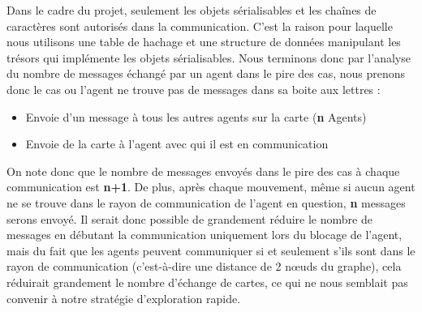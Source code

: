 \documentclass[10pt]{article}
\newcommand\tab[1][0.65cm]{\hspace*{#1}}
\begin{document}
\tab Dans le cadre du projet, seulement les objets sérialisables et les chaînes de caractères sont autorisés dans la communication. C'est la raison pour laquelle nous utilisons une table de hachage et une structure de données manipulant les trésors qui implémente les objets sérialisables. Nous terminons donc par l'analyse du nombre de messages échangé par un agent dans le pire des cas, nous prenons donc le cas ou l'agent ne trouve pas de messages dans sa boite aux lettres : 
\begin{itemize}
  \item Envoie d'un message à tous les autres agents sur la carte (\textbf{n} Agents)
  \item Envoie de la carte à l'agent avec qui il est en communication
\end{itemize}
On note donc que le nombre de messages envoyés dans le pire des cas à chaque communication est \textbf{n+1}. De plus, après chaque mouvement, même si aucun agent ne se trouve dans le rayon de communication de l'agent en question, \textbf{n} messages serons envoyé. Il serait donc possible de grandement réduire le nombre de messages en débutant la communication uniquement lors du blocage de l'agent, mais du fait que les agents peuvent communiquer si et seulement s'ils sont dans le rayon de communication (c'est-à-dire une distance de 2 n\oe{}uds du graphe), cela réduirait grandement le nombre d'échange de cartes, ce qui ne nous semblait pas convenir à notre stratégie d'exploration rapide. 
\end{document}

